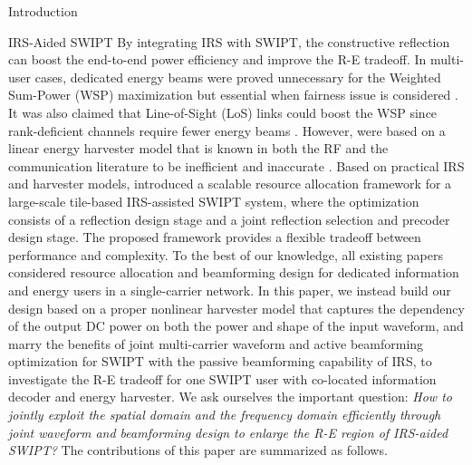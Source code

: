 \documentclass[journal]{IEEEtran}
\begin{document}
\begin{section}{Introduction}
		\begin{subsection}{IRS-Aided SWIPT}
			By integrating IRS with SWIPT, the constructive reflection can boost the end-to-end power efficiency and improve the R-E tradeoff. In multi-user cases, dedicated energy beams were proved unnecessary for the Weighted Sum-Power (WSP) maximization \cite{Wu2020b} but essential when fairness issue is considered \cite{Tang2019}. It was also claimed that Line-of-Sight (LoS) links could boost the WSP since rank-deficient channels require fewer energy beams \cite{Wu2020a}. However, \cite{Wu2020b,Tang2019,Wu2020a} were based on a linear energy harvester model that is known in both the RF and the communication literature to be inefficient and inaccurate \cite{Clerckx2019,Trotter2009,Clerckx2018,Clerckx2016a,Kim2019,Kim2020a,Kim2021,Clerckx2017,Kim2017,Clerckx2018b,Varasteh2020,Varasteh2019d,Varasteh2020a}. Based on practical IRS and harvester models, \cite{Xu2021c} introduced a scalable resource allocation framework for a large-scale tile-based IRS-assisted SWIPT system, where the optimization consists of a reflection design stage and a joint reflection selection and precoder design stage. The proposed framework provides a flexible tradeoff between performance and complexity. To the best of our knowledge, all existing papers considered resource allocation and beamforming design for dedicated information and energy users in a single-carrier network. In this paper, we instead build our design based on a proper nonlinear harvester model that captures the dependency of the output DC power on both the power and shape of the input waveform, and marry the benefits of joint multi-carrier waveform and active beamforming optimization for SWIPT with the passive beamforming capability of IRS, to investigate the R-E tradeoff for one SWIPT user with co-located information decoder and energy harvester. We ask ourselves the important question: \emph{How to jointly exploit the spatial domain and the frequency domain efficiently through joint waveform and beamforming design to enlarge the R-E region of IRS-aided SWIPT?} The contributions of this paper are summarized as follows.


\end{subsection}
\end{section}
\end{document}
